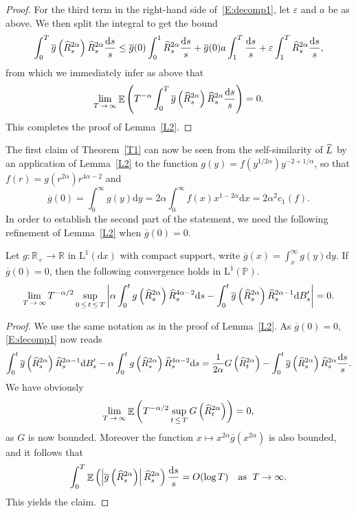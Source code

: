 \documentclass[AHL,Unicode,longabstracts,published]{cedram}
\renewcommand{\bar}[1]{\overline{#1}}
\renewcommand{\hat}[1]{\widehat{#1}}
\newcommand{\dd}{\mathrm{d}}
\newcommand{\rmL}{\mathrm{L}}
\DeclareMathOperator{\E}{\mathbb{E}}
\renewcommand{\P}{\mathbb{P}}
\newcommand{\R}{\mathbb{R}}
\let\oldhat\hat
\renewcommand*{\hat}[1]{\mathchoice{\widehat{#1}}{\widehat{#1}}{\oldhat{#1}}{\oldhat{#1}}}
\begin{document}
\begin{proof}
For the third term in the right-hand side of~\eqref{E:decomp1}, let $\varepsilon$ and $a$ be as above. We then split the integral to get the bound
\[
\int_0^T \bar g\left(\hat R^{2\alpha}_s\right) \hat R^{2\alpha}_s \frac{\dd s}{s}
\leq \bar g(0) \int_0^1 \hat R^{2\alpha}_s \frac{\dd s}{s} +\bar g(0) a \int_1^T \frac{\dd s}{s} + \varepsilon \int_1^T \hat R^{2\alpha}_s \frac{\dd s}{s},
\]
from which we immediately infer as above that
\[
\lim_{T\,\to\,\infty} \E\left(T^{-\alpha} \int_0^T \bar g\left(\hat R^{2\alpha}_s\right) \hat R^{2\alpha}_s \frac{\dd s}{s}\right)=0.
\]
This completes the proof of Lemma~\ref{L2}.
\end{proof}

The first claim of Theorem~\ref{T1} can now be seen from the self-similarity of $\hat{L}$ by an application of Lemma~\ref{L2} to the function $g(y)=f(y^{1/2\alpha}) y^{-2+1/\alpha}$, so that $f(r)= g(r^{2\alpha}) r^{4\alpha-2}$ and
\[
\bar g(0)=\int_0^{\infty} g(y) \dd y = 2\alpha \int_0^{\infty} f(x) x^{1-2\alpha} \dd x = 2\alpha^2 c_1(f).
\]
In order to establish the second part of the statement, we need the following refinement of Lemma~\ref{L2} when $\bar g(0)=0$.

\begin{lemm}\label{L3}
Let $g: \R_+\to \R$ in $\rmL^1(\dd x)$ with compact support, write $\bar g(x)=\int_x^{\infty}g(y)\dd y$. If $\bar g(0)=0$, then the following convergence holds in $\rmL^1(\P)$.
\[
\lim_{T\,\to\,\infty} T^{-\alpha/2} \sup_{0\,\leq\,t\,\leq \,T} \left| \alpha \int_0^{t} g\left(\hat R^{2\alpha}_s\right)\hat R_s^{4\alpha-2} \dd s - \int_0^t \bar g\left(\hat R^{2\alpha}_s\right) \hat R_s^{2\alpha-1} \dd B'_s \right| = 0.
\]
\end{lemm}

\begin{proof}
We use the same notation as in the proof of Lemma~\ref{L2}. As $\bar g(0)=0$, \eqref{E:decomp1} now reads
\[
\int_0^t \bar g\left(\hat R^{2\alpha}_s\right) \hat R_s^{2\alpha-1} \dd B'_s-\alpha \int_0^{t} g\left(\hat R^{2\alpha}_s\right)\hat R_s^{4\alpha-2} \dd s = \frac{1}{2\alpha} G\left(\hat R_t^{2\alpha}\right) - \int_0^t \bar g\left(\hat R^{2\alpha}_s\right) \hat R^{2\alpha}_s \frac{\dd s}{s}.
\]
We have obviously
\[
\lim_{T\,\to\,\infty} \E\left(T^{-\alpha/2} \sup_{t\,\leq\,T} G\left(\hat R_t^{2\alpha}\right)\right)=0,
\]
as $G$ is now bounded. Moreover the function $x \mapsto x^{2\alpha}\bar g(x^{2\alpha})$ is also bounded, and it follows that
\[
\int_0^T \E\left(\left|\bar g\left(\hat R^{2\alpha}_s\right)\right| \hat R^{2\alpha}_s\right)\frac{\dd s}{s} = O(\log T) \quad \text{as }\;T\to \infty.
\]
This yields the claim.
\end{proof}
\end{document}

